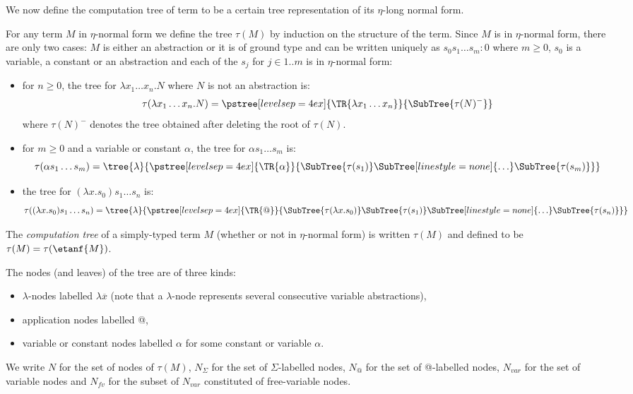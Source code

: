 We now define the computation tree of term to be a certain tree
representation of its $\eta$-long normal form.
\begin{dfn}
For any term $M$ in $\eta$-normal form we define the tree $\tau(M)$ by induction
on the structure of the term.
Since $M$ is in $\eta$-normal form, there are only two cases:
$M$ is either an abstraction or it is of ground type and can be written uniquely as
$s_0 s_1 \ldots s_m : 0$ where $m\geq0$,  $s_0$ is a variable, a
constant or an abstraction and each of the $s_j$ for $j\in 1..m$ is in $\eta$-normal form:
\begin{itemize}
\item for $n\geq0$, the tree for $\lambda x_1 \ldots x_n. N$ where $N$ is not an abstraction is:
$$ \tau(\lambda x_1 \ldots x_n . N) =
      \pstree[levelsep=4ex]
        { \TR{\lambda x_1 \ldots x_n} }
        { \SubTree{\tau(N)^{-}} }
$$
where $\tau(N)^{-}$ denotes the tree obtained after deleting the root of $\tau(N)$.


\item for $m\geq0$ and a variable or constant $\alpha$, the tree for $\alpha s_1 \ldots s_m$ is:
$$ \tau( \alpha s_1 \ldots s_m) =
    \tree{\lambda}
    {
        \pstree[levelsep=4ex]
            { \TR{\alpha} }
            { \SubTree{\tau(s_1)} \SubTree[linestyle=none]{\ldots} \SubTree{\tau(s_m)}
            }
    }
$$


\item the tree for $(\lambda x.s_0) s_1 \ldots s_n$ is:
$$ \tau((\lambda x.s_0) s_1 \ldots s_n) =
    \tree{\lambda}
    {
        \pstree[levelsep=4ex]
            { \TR{@} }
            {
            \SubTree{\tau(\lambda x.s_0)}    \SubTree{\tau(s_1)} \SubTree[linestyle=none]{\ldots} \SubTree{\tau(s_n)}
            }
    }
$$
\end{itemize}

The \emph{computation tree} of a simply-typed term $M$ (whether or not in $\eta$-normal form) is written $\tau(M)$
and defined to be $\tau(M) = \tau(\etanf{M})$.
\end{dfn}

The nodes (and leaves) of the tree are of three kinds:
\begin{itemize}
\item $\lambda$-nodes labelled $\lambda \overline{x}$ (note that a $\lambda$-node represents several consecutive variable abstractions),
\item application nodes labelled @,
\item variable or constant nodes labelled $\alpha$ for some constant or variable $\alpha$.
\end{itemize}
We write $N$ for the set of nodes of $\tau(M)$, $N_\Sigma$ for the set of $\Sigma$-labelled nodes,
$N_@$ for the set of @-labelled nodes, $N_{var}$ for the set of variable nodes and
$N_{fv}$ for the subset of $N_{var}$ constituted of free-variable nodes.


